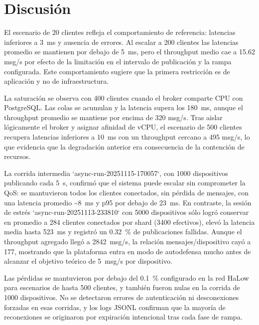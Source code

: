 ﻿\documentclass[conference]{IEEEtran}
\begin{document}
\section{Discusi\'on}
El escenario de \num{20} clientes refleja el comportamiento de referencia: latencias inferiores a \SI{3}{\milli\second} y ausencia de errores. Al escalar a \num{200} clientes las latencias promedio se mantienen por debajo de \SI{5}{\milli\second}, pero el throughput medio cae a \num{15.62} msg/s por efecto de la limitaci\'on en el intervalo de publicaci\'on y la rampa configurada. Este comportamiento sugiere que la primera restricci\'on es de aplicaci\'on y no de infraestructura.

La saturaci\'on se observa con \num{400} clientes cuando el broker comparte CPU con PostgreSQL. Las colas se acumulan y la latencia supera los \SI{180}{\milli\second}, aunque el throughput promedio se mantiene por encima de \num{320} msg/s. Tras aislar l\'ogicamente el broker y asignar afinidad de vCPU, el escenario de \num{500} clientes recupera latencias inferiores a \SI{10}{\milli\second} con un throughput cercano a \num{495} msg/s, lo que evidencia que la degradaci\'on anterior era consecuencia de la contenci\'on de recursos.

La corrida intermedia `async-run-20251115-170057`, con \num{1000} dispositivos publicando cada \SI{5}{\second}, confirm\'o que el sistema puede escalar sin comprometer la QoS: se mantuvieron todos los clientes conectados, sin p\'erdida de mensajes, con una latencia promedio \textasciitilde\SI{8}{\milli\second} y p95 por debajo de \SI{23}{\milli\second}. En contraste, la sesi\'on de estr\'es `async-run-20251113-233810` con \num{5000} dispositivos s\'olo logr\'o conservar en promedio a \num{284} clientes conectados por shard (\num{3400} efectivos), elev\'o la latencia media hasta \SI{523}{\milli\second} y registr\'o un \SI{0.32}{\percent} de publicaciones fallidas. Aunque el throughput agregado lleg\'o a \num{2842}~msg/s, la relaci\'on mensajes/dispositivo cay\'o a \num{177}, mostrando que la plataforma entra en modo de autodefensa mucho antes de alcanzar el objetivo te\'orico de 5~msg/s por dispositivo.

Las p\'erdidas se mantuvieron por debajo del \SI{0.1}{\percent} configurado en la red HaLow para escenarios de hasta \num{500} clientes, y tambi\'en fueron nulas en la corrida de \num{1000} dispositivos. No se detectaron errores de autenticaci\'on ni desconexiones forzadas en esas corridas, y los logs JSONL confirman que la mayor\'ia de reconexiones se originaron por expiraci\'on intencional tras cada fase de rampa.
\end{document}
